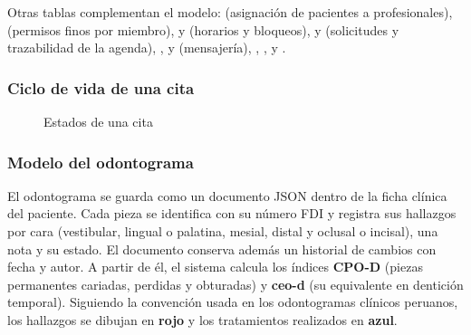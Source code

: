 \documentclass[11pt]{article}
\begin{document}
Otras tablas complementan el modelo:  (asignación de pacientes a profesionales),  (permisos finos por miembro),  y  (horarios y bloqueos),  y  (solicitudes y trazabilidad de la agenda), ,  y  (mensajería), , ,  y .

\subsubsection*{Ciclo de vida de una cita}

\begin{figure}[H]
\centering
{}
\caption{Estados de una cita}\label{fig:estados}
\end{figure}

\subsubsection*{Modelo del odontograma}

El odontograma se guarda como un documento JSON dentro de la ficha clínica del paciente. Cada pieza se identifica con su número FDI \parencite{iso3950} y registra sus hallazgos por cara (vestibular, lingual o palatina, mesial, distal y oclusal o incisal), una nota y su estado. El documento conserva además un historial de cambios con fecha y autor. A partir de él, el sistema calcula los índices \textbf{CPO-D} (piezas permanentes cariadas, perdidas y obturadas) y \textbf{ceo-d} (su equivalente en dentición temporal). Siguiendo la convención usada en los odontogramas clínicos peruanos, los hallazgos se dibujan en \textcolor{sdred}{\textbf{rojo}} y los tratamientos realizados en \textcolor{sdblue}{\textbf{azul}}.
\end{document}

